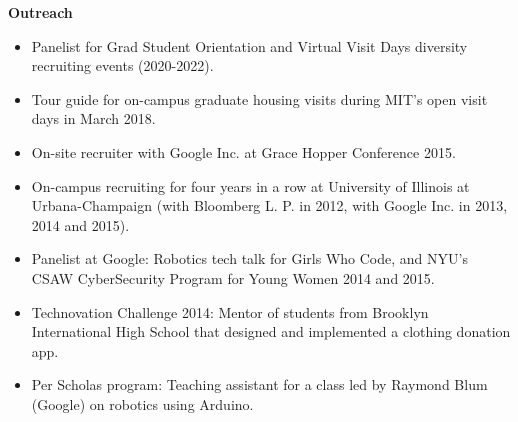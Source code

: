 \documentclass[line,margin]{res}
\begin{document}
\begin{resume}
%

  \textbf{Outreach}
  \begin{itemize}  \itemsep -2pt
  \item Panelist for Grad Student Orientation and Virtual Visit Days diversity recruiting events (2020-2022).
  \item Tour guide for on-campus graduate housing visits during MIT's open visit days in March 2018.
  \item On-site recruiter with Google Inc. at Grace Hopper Conference 2015.
  \item On-campus recruiting for four years in a row at University of Illinois at Urbana-Champaign (with Bloomberg L. P. in 2012, with Google Inc. in 2013, 2014 and 2015).
  \item Panelist at Google: Robotics tech talk for Girls Who Code, and NYU's CSAW CyberSecurity Program for Young Women 2014 and 2015.
  \item Technovation Challenge 2014: Mentor of students from Brooklyn International High School that designed and implemented a clothing donation app.
  \item Per Scholas program: Teaching assistant for a class led by Raymond Blum (Google) on robotics using Arduino.
  \end{itemize}


\end{resume}
\end{document}
